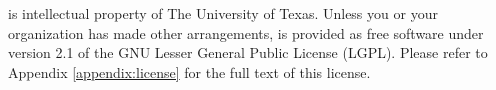 
\libflame is intellectual property of The University of Texas.
Unless you or your organization has made other arrangements, \libflame is
provided as free software under version 2.1 of the GNU Lesser General
Public License (LGPL).
Please refer to Appendix \ref{appendix:license} for the full text of this
license.

